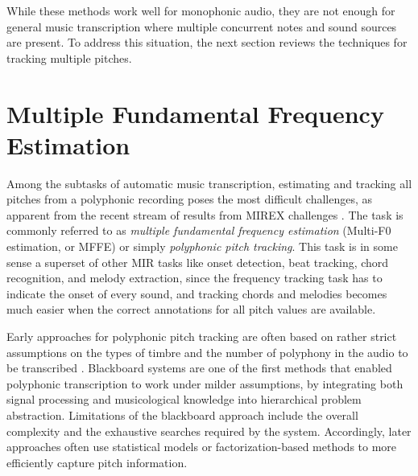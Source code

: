 While these methods work well for monophonic audio, they are not enough for general music transcription where multiple concurrent notes and sound sources are present.
To address this situation, the next section reviews the techniques for tracking multiple pitches.


\section{Multiple Fundamental Frequency Estimation}\label{sec:mffe}

Among the subtasks of automatic music transcription, estimating and tracking all pitches from a polyphonic recording poses the most difficult challenges, as apparent from the recent stream of results from MIREX challenges \cite{downie2014mirex}.
The task is commonly referred to as \emph{multiple fundamental frequency estimation} (Multi-F0 estimation, or MFFE) or simply \emph{polyphonic pitch tracking}.
This task is in some sense a superset of other MIR tasks like onset detection, beat tracking, chord recognition, and melody extraction,
since the frequency tracking task has to indicate the onset of every sound, and tracking chords and melodies becomes much easier when the correct annotations for all pitch values are available.



Early approaches for polyphonic pitch tracking are often based on rather strict assumptions on the types of timbre and the number of polyphony in the audio to be transcribed \cite{moorer1977transcription,piszczalski1977transcription}. Blackboard systems \cite{martin1996blackboard,dixon2000piano} are one of the first methods that enabled polyphonic transcription to work under milder assumptions, by integrating both signal processing and musicological knowledge into hierarchical problem abstraction. Limitations of the blackboard approach include the overall complexity and the exhaustive searches required by the system. Accordingly, later approaches often use statistical models or factorization-based methods to more efficiently capture pitch information.



